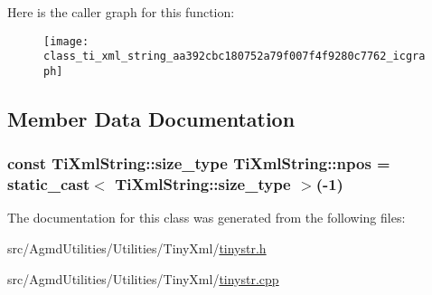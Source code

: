 Here is the caller graph for this function\+:\nopagebreak
\begin{figure}[H]
\begin{center}
\leavevmode
\texttt{[image: class\_ti\_xml\_string\_aa392cbc180752a79f007f4f9280c7762\_icgraph]}
\end{center}
\end{figure}




\subsection{Member Data Documentation}
\hypertarget{class_ti_xml_string_a8f4422d227088dc7bec96f479b275d0a}{
\subsubsection[{npos}]{\setlength{\rightskip}{0pt plus 5cm}const {\bf Ti\+Xml\+String\+::size\+\_\+type} Ti\+Xml\+String\+::npos = static\+\_\+cast$<$ {\bf Ti\+Xml\+String\+::size\+\_\+type} $>$(-\/1)\hspace{0.3cm}{\ttfamily [static]}}}\label{class_ti_xml_string_a8f4422d227088dc7bec96f479b275d0a}


The documentation for this class was generated from the following files\+:\begin{DoxyCompactItemize}
\item 
src/\+Agmd\+Utilities/\+Utilities/\+Tiny\+Xml/\hyperlink{tinystr_8h}{tinystr.\+h}\item 
src/\+Agmd\+Utilities/\+Utilities/\+Tiny\+Xml/\hyperlink{tinystr_8cpp}{tinystr.\+cpp}\end{DoxyCompactItemize}
